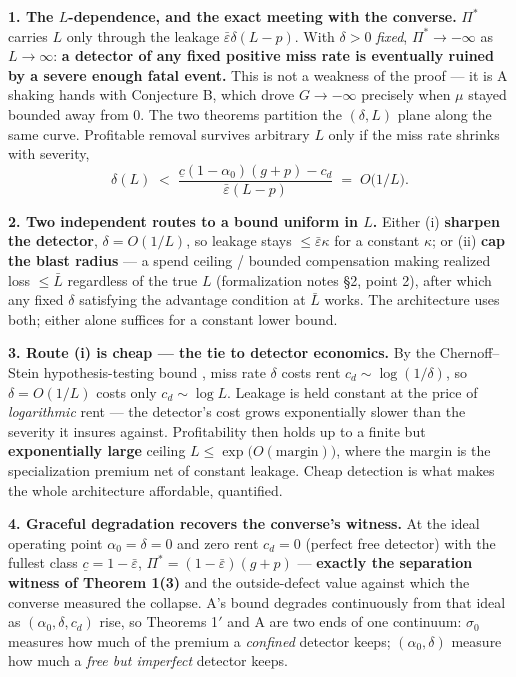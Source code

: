 \documentclass[11pt]{article}
\theoremstyle{plain}
\theoremstyle{definition}
\begin{document}
\textbf{1. The $L$-dependence, and the exact meeting with the converse.} $\Pi^*$
carries $L$ only through the leakage $\bar\varepsilon\delta(L-p)$. With
$\delta > 0$ \emph{fixed}, $\Pi^* \to -\infty$ as $L \to \infty$: \textbf{a detector of
any fixed positive miss rate is eventually ruined by a severe enough fatal
event.} This is not a weakness of the proof --- it is A shaking hands with
Conjecture B, which drove $G \to -\infty$ precisely when $\mu$ stayed bounded
away from $0$. The two theorems partition the $(\delta, L)$ plane along the
same curve. Profitable removal survives arbitrary $L$ only if the miss rate
shrinks with severity,
$$\delta(L) \;<\; \frac{\underline c(1-\alpha_0)(g+p) - c_d}{\bar\varepsilon(L-p)} \;=\; O\!\big(1/L\big).$$

\textbf{2. Two independent routes to a bound uniform in $L$.} Either
(i) \textbf{sharpen the detector}, $\delta = O(1/L)$, so leakage stays $\leq
\bar\varepsilon\kappa$ for a constant $\kappa$; or (ii) \textbf{cap the blast
radius} --- a spend ceiling / bounded compensation making realized loss
$\leq \bar L$ regardless of the true $L$ (formalization notes \S 2, point 2), after
which any fixed $\delta$ satisfying the advantage condition at $\bar L$ works.
The architecture uses both; either alone suffices for a constant lower bound.

\textbf{3. Route (i) is cheap --- the tie to detector economics.} By the
Chernoff--Stein hypothesis-testing bound \citep[Thm.~11.8.3]{coverthomas2006},
miss rate
$\delta$ costs rent $c_d \sim \log(1/\delta)$, so $\delta = O(1/L)$ costs only
$c_d \sim \log L$. Leakage is held constant at the price of \emph{logarithmic}
rent --- the detector's cost grows exponentially slower than the severity it
insures against. Profitability then holds up to a finite but \textbf{exponentially
large} ceiling $L \leq \exp\big(O(\text{margin})\big)$, where the margin is
the specialization premium net of constant leakage. Cheap detection is what
makes the whole architecture affordable, quantified.

\textbf{4. Graceful degradation recovers the converse's witness.} At the ideal
operating point $\alpha_0 = \delta = 0$ and zero rent $c_d = 0$ (perfect free
detector) with the fullest
class $\underline c = 1-\bar\varepsilon$, $\Pi^* = (1-\bar\varepsilon)(g+p)$
--- \textbf{exactly the separation witness of Theorem 1(3)} and the outside-defect
value against which the converse measured the collapse. A's bound degrades
continuously from that ideal as $(\alpha_0, \delta, c_d)$ rise, so Theorems 1$'$
and A are two ends of one continuum: $\sigma_0$ measures how much of the
premium a \emph{confined} detector keeps; $(\alpha_0, \delta)$ measure how much a
\emph{free but imperfect} detector keeps.
\end{document}
